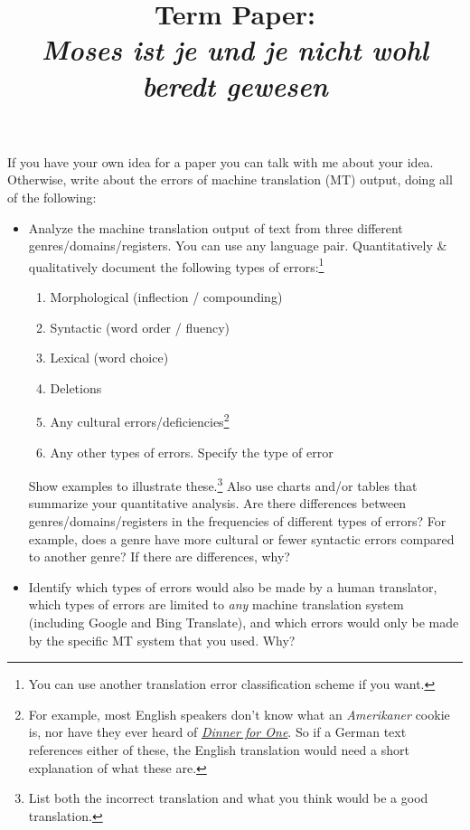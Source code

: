 \documentclass[10pt]{article}
\title{Term Paper: \\[1.0em] \Large{\textit{Moses ist je und je nicht wohl beredt gewesen}}}
\begin{document}
\maketitle


\begin{spacing}{1.35}

If you have your own idea for a paper you can talk with me about your idea.
Otherwise, write about the errors of machine translation (MT) output, doing all of the following:

\begin{itemize}
\item Analyze the machine translation output of text from three different genres/domains/registers.
	You can use any language pair.
	Quantitatively \& qualitatively document the following types of errors:\footnote{You can use another translation error classification scheme if you want.}
 \begin{spacing}{0.9}
 \begin{enumerate}
  \item Morphological (inflection / compounding)
  \item Syntactic (word order / fluency)
  \item Lexical (word choice)
  \item Deletions
  \item Any cultural errors/deficiencies\footnote{For example, most English speakers don't know what an \textit{Amerikaner} cookie is, nor have they ever heard of \href{https://en.wikipedia.org/wiki/Dinner_for_One}{\textit{Dinner for One}}.  So if a German text references either of these, the English translation would need a short explanation of what these are.}
  \item Any other types of errors.  Specify the type of error
 \end{enumerate}
 \end{spacing}

 Show examples to illustrate these.\footnote{List both the incorrect translation and what you think would be a good translation.}
 Also use charts and/or tables that summarize your quantitative analysis.
 Are there differences between genres/domains/registers in the frequencies of different types of errors?
 For example, does a genre have more cultural or fewer syntactic errors compared to another genre?
 If there are differences, why?

\item Identify which types of errors would also be made by a human translator, which types of errors are limited to \emph{any} machine translation system (including Google and Bing Translate), and which errors would only be made by the specific MT system that you used.
	Why?


\end{itemize}
\end{spacing}
\end{document}
